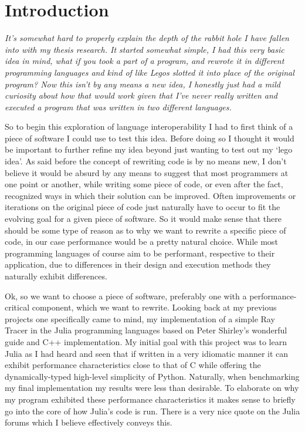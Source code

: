 \section{Introduction}\label{s:intro}

\textit{It's somewhat hard to properly explain the depth of the rabbit hole I have fallen into with my thesis research. It started somewhat simple, I had this very basic idea in mind, what if you took a part of a program, and rewrote it in different programming languages and kind of like Legos slotted it into place of the original program? Now this isn't by any means a new idea, I honestly just had a mild curiosity about how that would work given that I've never really written and executed a program that was written in two different languages.}

So to begin this exploration of language interoperability I had to first think of a piece of software I could use to test this idea. Before doing so I thought it would be important to further refine my idea beyond just wanting to test out my `lego idea'. As said before the concept of rewriting code is by no means new, I don't believe it would be absurd by any means to suggest that most programmers at one point or another, while writing some piece of code, or even after the fact, recognized ways in which their solution can be improved. Often improvements or iterations on the original piece of code just naturally have to occur to fit the evolving goal for a given piece of software. So it would make sense that there should be some type of reason as to why we want to rewrite a specific piece of code, in our case performance would be a pretty natural choice. While most programming languages of course aim to be performant, respective to their application, due to differences in their design and execution methods they naturally exhibit differences. 

Ok, so we want to choose a piece of software, preferably one with a performance-critical component, which we want to rewrite. Looking back at my previous projects one specifically came to mind, my implementation of a simple Ray Tracer in the Julia programming languages based on Peter Shirley's wonderful guide and C++ implementation. My initial goal with this project was to learn Julia as I had heard and seen that if written in a very idiomatic manner it can exhibit performance characteristics close to that of C while offering the dynamically-typed high-level simplicity of Python. Naturally, when benchmarking my final implementation my results were less than desirable. To elaborate on why my program exhibited these performance characteristics it makes sense to briefly go into the core of how Julia's code is run. There is a very nice quote on the Julia forums which I believe effectively conveys this.

